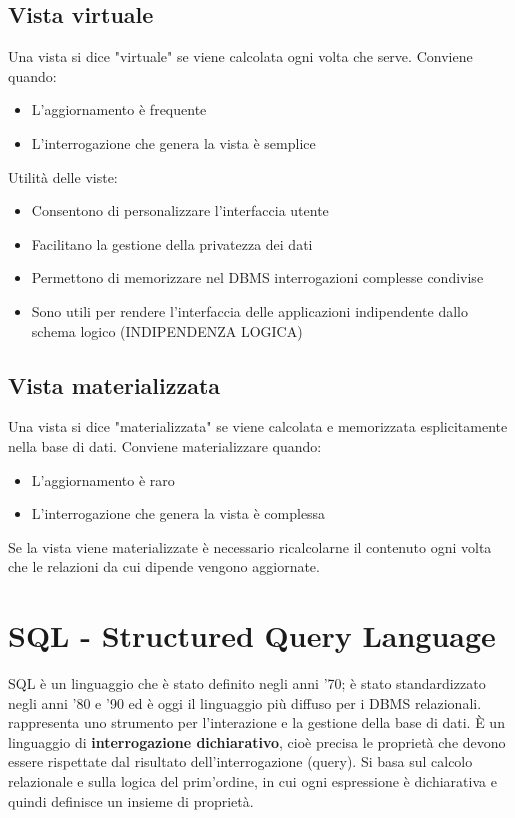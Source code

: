 \documentclass[a4paper, 10pt]{article}
\theoremstyle{definition}
\begin{document}
	\subsection*{Vista virtuale}
	Una vista si dice  "virtuale" se viene calcolata ogni volta che serve.
	Conviene quando:
	\begin{itemize}
		\item L'aggiornamento è frequente
		\item L'interrogazione che genera la vista è semplice
	\end{itemize}
	Utilità delle viste:
	\begin{itemize}
		\item Consentono di personalizzare l'interfaccia utente
		\item Facilitano la gestione della privatezza dei dati
		\item Permettono di memorizzare nel DBMS interrogazioni complesse
		condivise
		\item Sono utili per rendere l'interfaccia delle applicazioni
		indipendente dallo schema logico (INDIPENDENZA LOGICA)
	\end{itemize}		
	
	\subsection*{Vista materializzata}
	Una vista si dice "materializzata" se viene calcolata e memorizzata
	esplicitamente nella base di dati.
	Conviene materializzare quando:
	\begin{itemize}
		\item L'aggiornamento è raro
		\item L'interrogazione che genera la vista è complessa
	\end{itemize}
	
	Se la vista viene materializzate è necessario ricalcolarne il
	contenuto ogni volta che le relazioni da cui dipende vengono
	aggiornate.
	
	\section{SQL - Structured Query Language}
		SQL è un linguaggio che è stato definito negli
		anni '70; è stato standardizzato negli anni '80 e '90 ed è oggi
		il linguaggio più diffuso per i DBMS relazionali. rappresenta uno strumento per l'interazione e la gestione della base di dati.
		È un linguaggio di \textbf{interrogazione dichiarativo}, cioè precisa le proprietà che devono essere rispettate dal risultato dell'interrogazione (query).
		Si basa sul calcolo relazionale e sulla logica del prim'ordine, in cui ogni espressione è dichiarativa e quindi definisce un insieme di proprietà.
\end{document}
